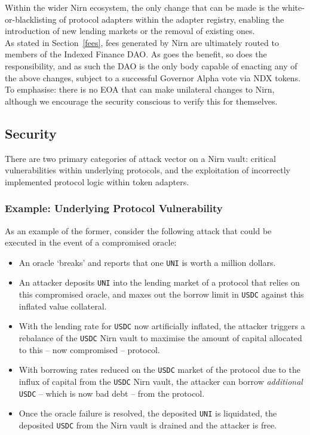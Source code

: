 \documentclass{article}
\begin{document}
\noindent
Within the wider Nirn ecosystem, the only change that can be made is the white-or-blacklisting of protocol adapters within the adapter registry, enabling the introduction of new lending markets or the removal of existing ones.\\

\noindent
As stated in Section~\ref{fees}, fees generated by Nirn are ultimately routed to members of the Indexed Finance DAO. As goes the benefit, so does the responsibility, and as such the DAO is the only body capable of enacting any of the above changes, subject to a successful Governor Alpha vote via NDX tokens.\\

\noindent
To emphasise: there is no EOA that can make unilateral changes to Nirn, although we encourage the security conscious to verify this for themselves.

\newpage
\subsection{Security}

There are two primary categories of attack vector on a Nirn vault: critical vulnerabilities within underlying protocols, and the exploitation of incorrectly implemented protocol logic within token adapters.

\subsubsection*{Example: Underlying Protocol Vulnerability}
\noindent
As an example of the former, consider the following attack that could be executed in the event of a compromised oracle:

\begin{itemize}
    \item An oracle `breaks' and reports that one \texttt{UNI} is worth a million dollars.
    \item An attacker deposits \texttt{UNI} into the lending market of a protocol that relies on this compromised oracle, and maxes out the borrow limit in \texttt{USDC} against this inflated value collateral.
    \item With the lending rate for \texttt{USDC} now artificially inflated, the attacker triggers a rebalance of the \texttt{USDC} Nirn vault to maximise the amount of capital allocated to this -- now compromised -- protocol.
    \item With borrowing rates reduced on the \texttt{USDC} market of the protocol due to the influx of capital from the \texttt{USDC} Nirn vault, the attacker can borrow \textit{additional} \texttt{USDC} -- which is now bad debt -- from the protocol.
    \item Once the oracle failure is resolved, the deposited \texttt{UNI} is liquidated, the deposited \texttt{USDC} from the Nirn vault is drained and the attacker is free.
\end{itemize}
\end{document}
